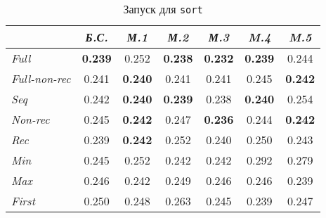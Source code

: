 \begin{table}[h!]

\center
\begin{tabular}{|l|c|c|c|c|c|c|}
\hline
                  &{\it Б.С.}&{\it М.1}&{\it М.2}&{\it М.3}&{\it M.4}&{\it M.5}\\ \hline

{\it Full        } & {\bf 0.239} & 0.252       & {\bf 0.238} & {\bf 0.232} & {\bf 0.239} & 0.244 \\ \hline
{\it Full-non-rec} & 0.241       & {\bf 0.240} & 0.241       & 0.241       & 0.245       & {\bf 0.242} \\ \hline
{\it Seq         } & 0.242       & {\bf 0.240} & {\bf 0.239} & 0.238       & {\bf 0.240} & 0.254 \\ \hline
{\it Non-rec     } & 0.245       & {\bf 0.242} & 0.247       & {\bf 0.236} & 0.244       & {\bf 0.242} \\ \hline
{\it Rec         } & 0.239       & {\bf 0.242} & 0.252       & 0.240       & 0.250       & 0.243 \\ \hline
{\it Min         } & 0.245       & 0.252       & 0.242       & 0.242       & 0.292       & 0.279 \\ \hline
{\it Max         } & 0.246       & 0.242       & 0.249       & 0.246       & 0.246       & 0.239 \\ \hline
{\it First       } & 0.250       & 0.248       & 0.263       & 0.245       & 0.239       & 0.247 \\ \hline


\end{tabular}
\caption{Запуск для \lstinline{sort}}
\label{fig:sortTest}
\end{table}

